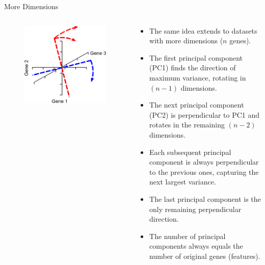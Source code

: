 \begin{frame}[allowframebreaks]{More Dimensions}    
    \begin{columns}
    \begin{column}{0.4\textwidth}
        \begin{figure}
            \centering
            \includegraphics[width=1\textwidth,keepaspectratio]{images/dul/dim-reduce/multi-pcs.png}
        \end{figure}
    \end{column}
    \begin{column}{0.6\textwidth}
        \begin{itemize}
            \item The same idea extends to datasets with more dimensions ($n$ genes).
            \item The first principal component (PC1) finds the direction of maximum variance, rotating in $(n-1)$ dimensions.
            \item The next principal component (PC2) is perpendicular to PC1 and rotates in the remaining $(n-2)$ dimensions.
            \item Each subsequent principal component is always perpendicular to the previous ones, capturing the next largest variance.
            \item The last principal component is the only remaining perpendicular direction.
            \item The number of principal components always equals the number of original genes (features).
        \end{itemize}
    \end{column}
    \end{columns}
\end{frame}


